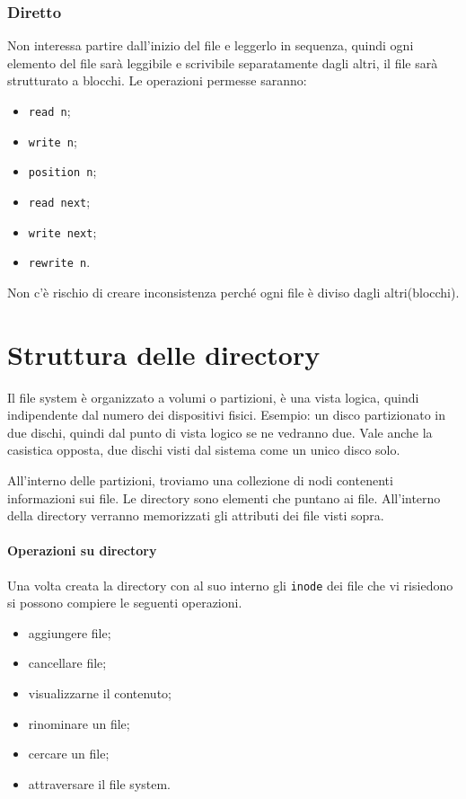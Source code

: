 \documentclass[a4paper, 12pt]{book}
\begin{document}
\subsubsection{Diretto}

Non interessa partire dall'inizio del file e leggerlo in sequenza, 
quindi ogni elemento del file sarà leggibile e scrivibile 
separatamente dagli altri, il file sarà strutturato a blocchi.
Le operazioni permesse saranno:
\begin{itemize}
    \item \verb|read n|;
    \item \verb|write n|;
    \item \verb|position n|;
    \item \verb|read next|;
    \item \verb|write next|;
    \item \verb|rewrite n|.
\end{itemize}
Non c'è rischio di creare inconsistenza perché ogni file è 
diviso dagli altri(blocchi).

\section{Struttura delle directory}

Il file system è organizzato a volumi o partizioni, è una vista 
logica, quindi indipendente dal numero dei dispositivi fisici.
Esempio: un disco partizionato in due dischi, quindi dal punto 
di vista logico se ne vedranno due. Vale anche la casistica opposta,
due dischi visti dal sistema come un unico disco solo.

All'interno delle partizioni, troviamo una collezione di nodi 
contenenti informazioni sui file. Le directory sono elementi 
che puntano ai file. All'interno della directory verranno memorizzati 
gli attributi dei file visti sopra.

\paragraph{Operazioni su directory}Una volta creata la directory con al suo interno gli \verb|inode|
dei file che vi risiedono si possono compiere le seguenti 
operazioni.
\begin{itemize}
    \item aggiungere file;
    \item cancellare file;
    \item visualizzarne il contenuto;
    \item rinominare un file;
    \item cercare un file;
    \item attraversare il file system.
\end{itemize}
\end{document}
